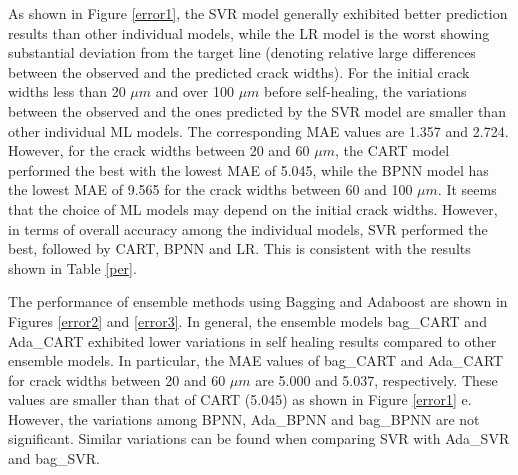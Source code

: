 \documentclass[11pt]{article}
\begin{document}

    As shown in Figure \ref{error1}, the SVR model generally exhibited better prediction results than other individual models, while the LR model is the worst showing substantial deviation from the target line (denoting relative large differences between the observed and the predicted crack widths). For the initial crack widths less than 20 $\mu m$ and over 100 $\mu m$ before self-healing, the variations between the observed and the ones predicted by the SVR model are smaller than other individual ML models. The corresponding MAE values  are 1.357 and 2.724. However, for the crack widths between 20 and 60 $\mu m$, the CART model performed the best with the lowest MAE of 5.045, while the BPNN model has the lowest MAE of 9.565 for the crack widths between 60 and 100 $\mu m$. It seems that the choice of ML models may depend on the initial crack widths. However, in terms of overall accuracy among the individual models, SVR performed the best, followed by CART, BPNN and LR. This is consistent with the results shown in Table \ref{per}. 
	
    The performance of ensemble methods using Bagging and Adaboost are shown in Figures \ref{error2} and \ref{error3}. In general, the ensemble models  bag\_CART and Ada\_CART exhibited lower variations in self healing results compared to other ensemble models. In particular, the MAE values of bag\_CART and Ada\_CART for crack widths between 20 and 60 $\mu m$ are 5.000 and 5.037, respectively. These values are smaller than that of CART (5.045) as shown in Figure \ref{error1} e. However, the variations among BPNN, Ada\_BPNN and bag\_BPNN are not significant. Similar variations can be found when comparing SVR with Ada\_SVR and bag\_SVR.
    
\end{document}
